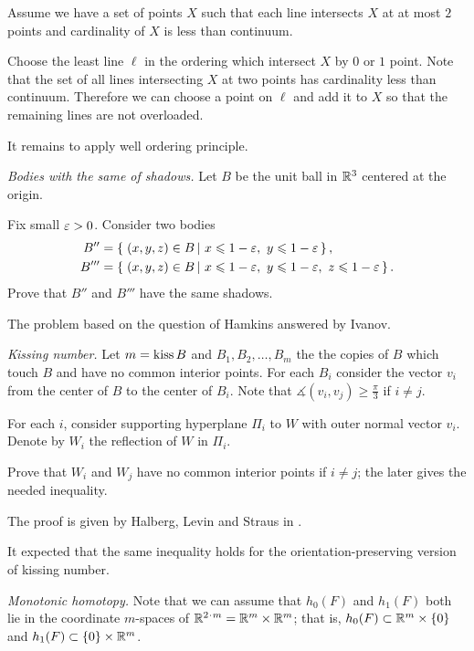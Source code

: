Assume we have a set of points $X$ such that each line intersects $X$ at at most $2$ points and cardinality of $X$ is less than continuum.

Choose the least line $\ell$ in the ordering which intersect $X$ 
by $0$ or $1$ point.
Note that the set of all lines intersecting $X$ at two points has cardinality less than continuum.
Therefore we can choose a point on $\ell$ and add it to $X$ so that the remaining lines are not overloaded.

It remains to apply well ordering principle.



\textit{Bodies with the same of shadows.}
Let $B$ be the unit ball in $\mathbb{R}^3$ centered at the origin.

Fix small $\varepsilon>0$.
Consider two bodies 
\begin{align*}
B''&=\set{(x,y,z)\in B}{x\le 1-\eps,\  y\le 1-\eps},
\\ 
B'''&=\set{(x,y,z)\in B}{x\le 1-\eps,\  y\le 1-\eps,\  z\le 1-\eps}.
\end{align*}
Prove that $B''$ and $B'''$ have the same shadows.

 The problem based on the question of Hamkins \cite{hamkins} answered by Ivanov.



\textit{Kissing number.}
Let $m=\mathop{\rm kiss} B$
and $B_1,B_2,\dots, B_m$ the the copies of $B$ 
which touch $B$ and have no common interior points.
For each $B_i$ consider the vector $v_i$ from the center of $B$ to the center of $B_i$.
Note that $\measuredangle(v_i,v_j)\ge \tfrac\pi3$ if $i\ne j$.

For each $i$,
consider supporting hyperplane $\Pi_i$
to $W$
with outer normal vector $v_i$.
Denote by $W_i$ the reflection of $W$ in $\Pi_i$.

Prove that $W_i$ and $W_j$ have no common interior points if $i\ne j$;
the later gives the needed inequality.

The proof is given by Halberg, Levin and Straus in \cite{halberg-levin-straus}.

It expected that the same inequality holds for the orientation-preserving version of kissing number.



\textit{Monotonic homotopy.}
Note that we can assume
that $h_0(F)$ and $h_1(F)$ both lie in the coordinate $m$-spaces of $\RR^{2\cdot m}=\RR^m\times \RR^m$;
that is,
$h_0(F)\z\subset\RR^m\times\{0\}$
and $h_1(F)\subset  \{0\}\times\mathbb{R}^m$.

